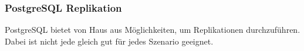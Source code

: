 
\subsubsection{\Gls{PostgreSQL} Replikation}
PostgreSQL bietet von Haus aus Möglichkeiten, um Replikationen durchzuführen.
Dabei ist nicht jede gleich gut für jedes Szenario geeignet\cite{FZAHA89U}.